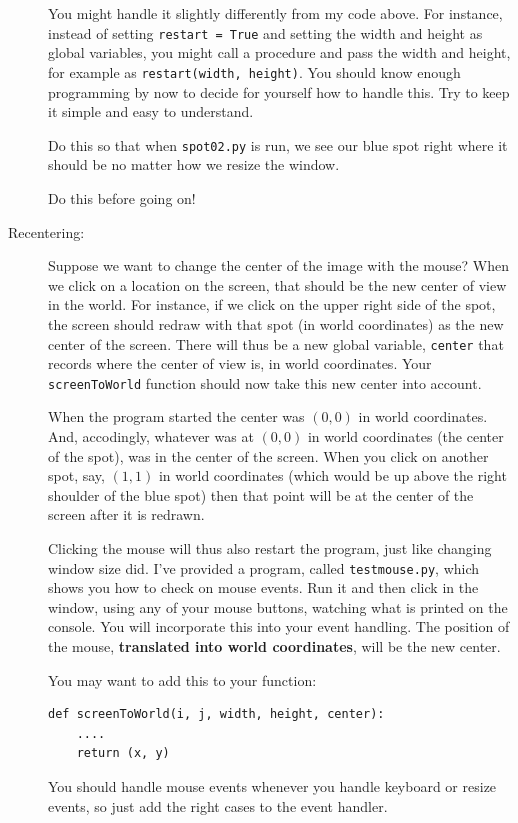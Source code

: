 \documentclass[12pt]{article}
\begin{document}
\begin{description}
You might handle it slightly differently
from my code above.  For instance, instead
of setting \lstinline{restart = True}
and setting the width and height as global variables,
you might call a procedure and pass the
width and height, for example as 
\lstinline{restart(width, height)}.
You should know enough programming by now to
decide for yourself how to handle this.
Try to keep it simple and easy to understand.

Do this so that when {\tt spot02.py} is run,
we see our blue spot right where it should be
no matter how we resize the window.

Do this before going on!

\item[Recentering:]
Suppose we want to change the center of the image
with the mouse?  When we click on a location on the screen,
that should be the new center of view in the world.
For instance, if we click on the upper right side of the
spot, the screen should redraw with that spot 
(in world coordinates)
as the new center of the screen.  There will thus be a 
new global variable, \lstinline{center} that records where
the center of view is, in world coordinates.
Your \lstinline{screenToWorld} function should 
now take this new center into account.

When the program started the center was $(0,0)$
in world coordinates.  And, accodingly, 
whatever was at $(0,0)$ in world coordinates
(the center of the spot), was in the center
of the screen.  When you click on another spot,
say, $(1,1)$ in world coordinates (which would be 
up above the right shoulder of the blue spot)
then that point will be at the center of the
screen after it is redrawn.

Clicking the mouse will thus also restart the
program, just like changing window size did.
I've provided a program, 
called \lstinline{testmouse.py}, which
shows you how to check on mouse events. 
Run it and then click in the window, using
any of your mouse buttons, watching
what is printed on the console. 
You will incorporate this into your event 
handling.  The position of the mouse,
{\bf translated into world coordinates}, will be
the new center.

You may want to add this to your function:
\begin{lstlisting}
def screenToWorld(i, j, width, height, center):
    ....
    return (x, y)
\end{lstlisting}

You should handle mouse events whenever you
handle keyboard or resize events, so just add
the right cases to the event handler.


\end{description}
\end{document}
